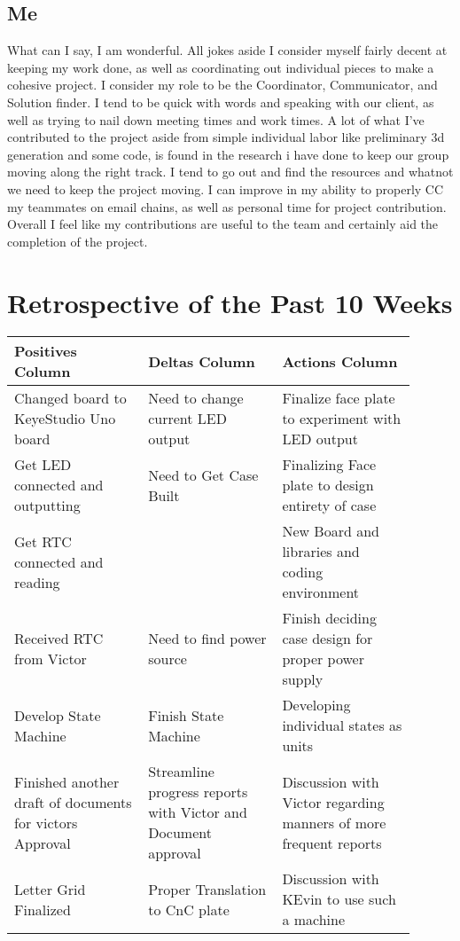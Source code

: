 \documentclass[onecolumn, draftclsnofoot,10pt, compsoc]{IEEEtran}
\begin{document}
\subsection{Me}
What can I say, I am wonderful.
All jokes aside I consider myself fairly decent at keeping my work done, as well as coordinating out individual pieces to make a cohesive project.
I consider my role to be the Coordinator, Communicator, and Solution finder.
I tend to be quick with words and speaking with our client, as well as trying to nail down meeting times and work times.
A lot of what I've contributed to the project aside from simple individual labor like preliminary 3d generation and some code, is found in the research i have done to keep our group moving along the right track.
I tend to go out and find the resources and whatnot we need to keep the project moving.
I can improve in my ability to properly CC my teammates on email chains, as well as personal time for project contribution.
Overall I feel like my contributions are useful to the team and certainly aid the completion of the project.

\newpage
\section{Retrospective of the Past 10 Weeks}
\vspace{2mm}
\begin{center}
\begin{tabular}{| p{0.3\linewidth} | p{0.3\linewidth} | p{0.3\linewidth} |}
\hline
Positives Column &
Deltas Column &
Actions Column \\
\hline
Changed board to KeyeStudio Uno board &
Need to change current LED output &
Finalize face plate to experiment with LED output \\
\hline
Get LED connected and outputting &
Need to Get Case Built &
Finalizing Face plate to design entirety of case \\
\hline
Get RTC connected and reading &
 &
New Board and libraries and coding environment \\
\hline
Received RTC from Victor &
Need to find power source &
Finish deciding case design for proper power supply\\
\hline
Develop State Machine &
Finish State Machine &
Developing individual states as units \\
\hline
Finished another draft of documents for victors Approval &
Streamline progress reports with Victor and Document approval &
Discussion with Victor regarding manners of more frequent reports \\
\hline
Letter Grid Finalized &
Proper Translation to CnC plate &
Discussion with KEvin to use such a machine\\
\hline


\end{tabular}
\end{center}
\end{document}
